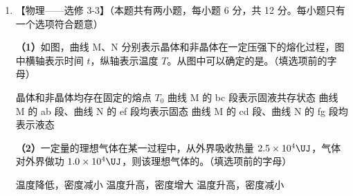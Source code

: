 \documentclass[\gkver]{gaokaozhenti}
\begin{document}
\begin{enumerate}
{$qv_{1}B=qE$ ③

又

$S=v_{1}T$ ④

式中 $T=\frac{2\pi m}{qB}$，由③④式解得

$S=\frac{2\pi mE}{qB^{2}}$ ⑤

Ⅱ、设粒子在 $y$ 方向上的最大位移为 $y_{m}$（图丙曲线的最高点处），对应的粒子运动速度大小为 $v_{2}$（方向沿 $x$ 轴），因为粒子在 $y$ 方向上的运动为简谐运动，因而在 $y=0$ 和 $y=y_{m}$ 处粒子所受的合外力大小相等，方向相反，则

$qv_{0}B-qE=-(qv_{2}B-qE)$ ⑥

由动能定理有

$-qEy_{m}=\frac{1}{2}mv_{2}^{2}-\frac{1}{2}mv_{0}^{2}$ ⑦

又

$A=\frac{1}{2}y_{m}$ ⑧

由⑥⑦⑧式解得

$A=\frac{m}{qB}\left(v_{0}-\frac{E}{B}\right)$

可写出图丙曲线满足的简谐运动 $y-t$ 函数表达式为

$y=\frac{m}{qB}\left(v_{0}-\frac{E}{B}\right)\left(1-\cos\frac{qB}{m}t\right)$
}

\item
【物理——选修 3-3】（本题共有两小题，每小题 6 分，共 12 分。每小题只有一个选项符合题意）

\textbf{（1）}如图，曲线 M、N 分别表示晶体和非晶体在一定压强下的熔化过程，图中横轴表示时间 $t$，纵轴表示温度 $T$。从图中可以确定的是。（填选项前的字母）


\fourchoices
{晶体和非晶体均存在固定的熔点 $T_{0}$}
{曲线 M 的 bc 段表示固液共存状态}
{曲线 M 的 ab 段、曲线 N 的 ef 段均表示固态}
{曲线 M 的 cd 段、曲线 N 的 fg 段均表示液态}

\textbf{（2）}一定量的理想气体在某一过程中，从外界吸收热量 $2.5\times10^{4}\UJ$，气体对外界做功 $1.0\times10^{4}\UJ$，则该理想气体的。（填选项前的字母）

{温度降低，密度减小}
{温度升高，密度增大}
{温度升高，密度减小}
\end{enumerate}
\end{document}
